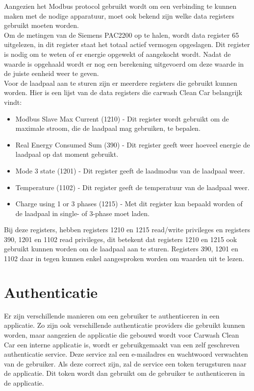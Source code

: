 Aangezien het Modbus protocol gebruikt wordt om een verbinding te kunnen maken met de nodige apparatuur, moet ook bekend zijn welke data registers gebruikt moeten worden.\\

Om de metingen van de Siemens PAC2200 op te halen, wordt data register 65 uitgelezen, in dit register staat het totaal actief vermogen opgeslagen. Dit register is nodig om te weten of er energie opgewekt of aangekocht wordt. Nadat de waarde is opgehaald wordt er nog een berekening uitgevoerd om deze waarde in de juiste eenheid weer te geven.\\

Voor de laadpaal aan te sturen zijn er meerdere registers die gebruikt kunnen worden. Hier is een lijst van de data registers die carwash Clean Car belangrijk vindt:

\begin{itemize}
    \item Modbus Slave Max Current (1210) - Dit register wordt gebruikt om de maximale stroom, die de laadpaal mag gebruiken, te bepalen.
    \item Real Energy Consumed Sum (390) - Dit register geeft weer hoeveel energie de laadpaal op dat moment gebruikt.
    \item Mode 3 state (1201) - Dit register geeft de laadmodus van de laadpaal weer.
    \item Temperature (1102) - Dit register geeft de temperatuur van de laadpaal weer.
    \item Charge using 1 or 3 phases (1215) - Met dit register kan bepaald worden of de laadpaal in single- of 3-phase moet laden.
\end{itemize}

Bij deze registers, hebben registers 1210 en 1215 read/write privileges en registers 390, 1201 en 1102 read privileges, dit betekent dat registers 1210 en 1215 ook gebruikt kunnen worden om de laadpaal aan te sturen. Registers 390, 1201 en 1102 daar in tegen kunnen enkel aangesproken worden om waarden uit te lezen.

\section{Authenticatie}
\label{sec:stand-van-zaken-authenticatie}

Er zijn verschillende manieren om een gebruiker te authenticeren in een applicatie. Zo zijn ook verschillende authenticatie providers die gebruikt kunnen worden, maar aangezien de applicatie die gebouwd wordt voor Carwash Clean Car een interne applicatie is, wordt er gebruikgemaakt van een zelf geschreven authenticatie service. Deze service zal een e-mailadres en wachtwoord verwachten van de gebruiker. Als deze correct zijn, zal de service een token terugsturen naar de applicatie. Dit token wordt dan gebruikt om de gebruiker te authenticeren in de applicatie.


